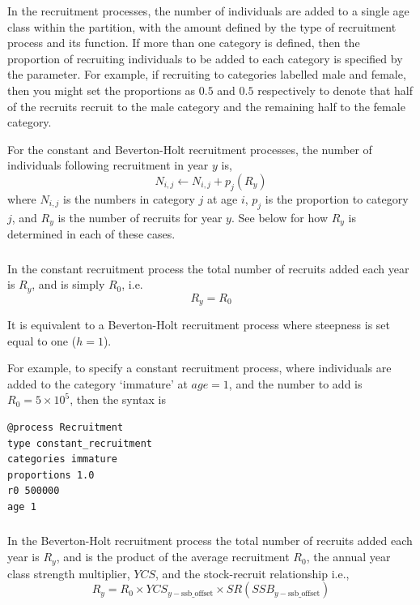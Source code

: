 In the recruitment processes, the number of individuals are added to a single age class within the partition, with the amount defined by the type of recruitment process and its function. If more than one category is defined, then the proportion of recruiting individuals to be added to each category is specified by the  parameter. For example, if recruiting to categories labelled male and female, then you might set the proportions as $0.5$ and $0.5$ respectively to denote that half of the recruits recruit to the male category and the remaining half to the female category.

For the constant and Beverton-Holt recruitment processes, the  number of individuals following recruitment in year $y$ is,  
\begin{equation}
N_{i,j} \leftarrow N_{i,j} + p_j(R_y)
\end{equation}
where $N_{i,j}$ is the numbers in category $j$ at age $i$, $p_j$ is the proportion to category $j$, and $R_y$ is the number of recruits for year $y$. See below for how $R_y$ is determined in each of these cases.

\subsubsection*{}
In the constant recruitment process the total number of recruits added each year is $R_y$, and is simply $R_0$, i.e.
\begin{equation}
  R_y = R_0
\end{equation}

It is equivalent to a Beverton-Holt recruitment process where steepness is set equal to one ($h=1$).

For example, to specify a constant recruitment process, where individuals are added to the category `immature' at $age=1$, and the number to add is $R_0=5 \times 10^5$, then the syntax is

{\small{\begin{verbatim}
@process Recruitment
type constant_recruitment
categories immature
proportions 1.0
r0 500000
age 1
\end{verbatim}}}

\subsubsection*{}
In the Beverton-Holt recruitment process the total number of recruits added each year is $R_y$, and is the product of the average recruitment $R_0$, the annual year class strength multiplier, $YCS$, and the stock-recruit relationship i.e.,
\begin{equation}
  R_y = R_0 \times YCS_{y-\text{ssb\_offset}} \times SR(SSB_{y-\text{ssb\_offset}})
\end{equation}
  
